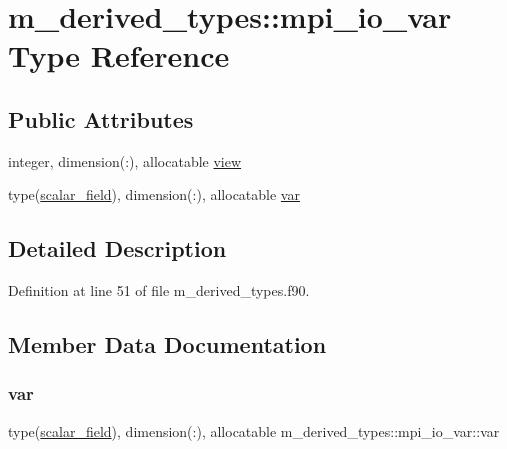 \hypertarget{structm__derived__types_1_1mpi__io__var}{}\section{m\+\_\+derived\+\_\+types\+:\+:mpi\+\_\+io\+\_\+var Type Reference}
\label{structm__derived__types_1_1mpi__io__var}
\subsection*{Public Attributes}
\begin{DoxyCompactItemize}
\item 
integer, dimension(\+:), allocatable \hyperlink{structm__derived__types_1_1mpi__io__var_a19194d57a71bab3f81f1bb6c05743fed}{view}
\item 
type(\hyperlink{structm__derived__types_1_1scalar__field}{scalar\+\_\+field}), dimension(\+:), allocatable \hyperlink{structm__derived__types_1_1mpi__io__var_a41c471a62a6f28ebeeee8e51327d59f7}{var}
\end{DoxyCompactItemize}


\subsection{Detailed Description}


Definition at line 51 of file m\+\_\+derived\+\_\+types.\+f90.



\subsection{Member Data Documentation}
\mbox{\label{structm__derived__types_1_1mpi__io__var_a41c471a62a6f28ebeeee8e51327d59f7}} 
\subsubsection{\texorpdfstring{var}{var}}
{\footnotesize\ttfamily type(\hyperlink{structm__derived__types_1_1scalar__field}{scalar\+\_\+field}), dimension(\+:), allocatable m\+\_\+derived\+\_\+types\+::mpi\+\_\+io\+\_\+var\+::var}



